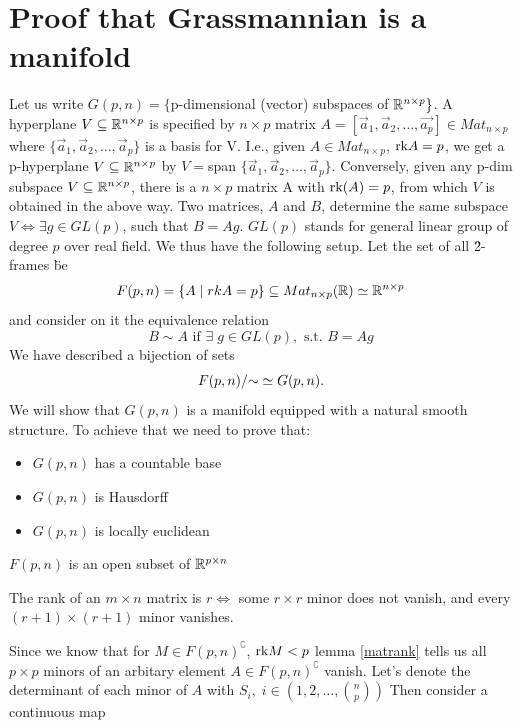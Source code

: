 \documentclass[11pt,a4paper]{report}
\begin{document}
\section{Proof that Grassmannian is a manifold}
Let us write $G(p,n) = \{ $p-dimensional (vector) subspaces of $\mathbb{R}^{n \times p} \}$. A hyperplane $V \subseteq \mathbb{R}^{n \times p}$ is specified by $n \times p$ matrix $A=[\vec{a}_1,\vec{a}_2, \dots, \vec{a_p}] \in Mat_{n\times p}$ where 
$\{\vec{a}_1, \vec{a}_2, \dots , \vec{a}_p \}$ is a basis for V. I.e., given $A \in Mat_{n\times p}$, $\textrm{rk} A = p$, we get a p-hyperplane $V \subseteq \mathbb{R}^{n \times p}$ by $V= $span $\{\vec{a}_1,\vec{a}_2, \dots, \vec{a}_p \} $. Conversely, given any p-dim subspace $V\subseteq \mathbb{R}^{n \times p}$, there is a $n \times p$
matrix A with $\textrm{rk}(A)=p$, from which $V$ is obtained in the above way. Two matrices, $A$ and $B$, determine the same subspace $V \iff \exists g \in GL(p) $, such that $B = A g$. $GL(p)$ stands for general linear group of degree $p$ over real field.
\newline
We thus have the following setup. Let the set of all \" 2-frames \" be
$$ F(p,n) = \{ A \; | \;  rkA=p \} \subseteq Mat_{n \times p}(\mathbb{R})  \simeq \mathbb{R}^{n \times p} $$
and consider on it the equivalence relation
$$ B \sim A \text{ if } \exists \; g \in GL(p), \text{ s.t. } B=Ag $$
We have described a bijection of sets
$$ F(p,n)/{\sim} \simeq  G(p,n). $$ 
We will show that $G(p,n)$ is a manifold equipped with a natural smooth structure. To achieve that we need to prove that:
\begin{itemize}
    \item $G(p,n)$ has a countable base
    \item $G(p,n)$ is Hausdorff
    \item $G(p,n)$ is locally euclidean
\end{itemize}
\begin{Prop}
    $F(p,n)$ is an open subset of $\mathbb{R}^{p \times n}$
\end{Prop}
\begin{Lemma}\label{matrank}
    The rank of an $m \times n$ matrix is $r \iff$ some $r \times r$ minor does not vanish,
    and every $(r+1) \times (r+1)$ minor vanishes.
\end{Lemma}
Since we know that for $M \in F(p,n)^\complement$, $\textrm{rk} M <p$ lemma \ref{matrank} tells us all $p \times p$ minors
of an arbitary element $ A \in F(p,n)^\complement$ vanish. Let's denote the determinant of each minor of $A$ with $S_i, \; i\in (1,2, \dots ,  {n \choose p})$ 
Then consider a continuous map
\end{document}
